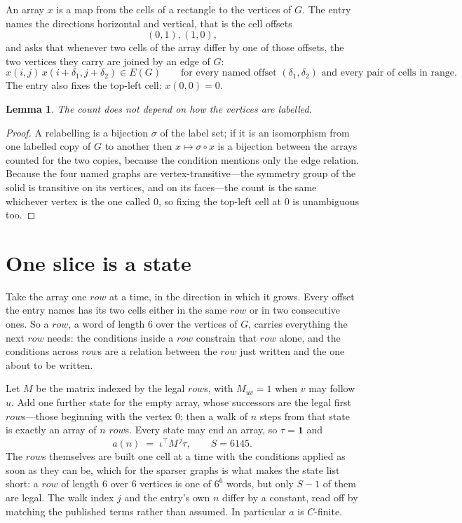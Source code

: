 \documentclass[11pt,a4paper]{article}
\theoremstyle{plain}
\newtheorem{lemma}[theorem]{Lemma}
\theoremstyle{definition}
\begin{document}
An array $x$ is a map from the cells of a rectangle to the vertices of $G$. The entry names the
directions horizontal and vertical, that is the cell offsets
\[
(0,1), (1,0),
\]
and asks that whenever two cells of the array differ by one of those offsets, the two vertices
they carry are joined by an edge of $G$:
\[
x(i,j)\,x(i+\delta_1,j+\delta_2)\in E(G)\qquad
\text{for every named offset } (\delta_1,\delta_2)\text{ and every pair of cells in range.}
\]
The entry also fixes the top-left cell: $x(0,0)=0$.

\begin{lemma}\label{lem:label}
The count does not depend on how the vertices are labelled.
\end{lemma}

\begin{proof}
A relabelling is a bijection $\sigma$ of the label set; if it is an isomorphism from one
labelled copy of $G$ to another then $x\mapsto\sigma\circ x$ is a bijection between the arrays
counted for the two copies, because the condition mentions only the edge relation.
Because the four named graphs are vertex-transitive---the symmetry group of the solid is transitive on its vertices, and on its faces---the count is the same whichever vertex is the one called $0$, so fixing the top-left cell at $0$ is unambiguous too.
\end{proof}

\section{One slice is a state}

Take the array one $row$ at a time, in the direction in which it grows.
Every offset the entry names has its two cells either in the same $row$ or in two
consecutive ones. So a $row$, a word of length $6$ over the vertices of $G$, carries
everything the next $row$ needs: the conditions inside a $row$ constrain that
$row$ alone, and the conditions across $row$s are a relation between the
$row$ just written and the one about to be written.

Let $M$ be the matrix indexed by the legal $row$s, with $M_{uv}=1$ when $v$ may
follow $u$. Add one further state for the empty array, whose successors are the legal first
$row$s---those beginning with the vertex $0$; then a walk of
$n$ steps from that state is exactly an array of $n$ $row$s. Every state may end an
array, so $\tau=\mathbf{1}$ and
\[
a(n)\;=\;\iota^{\!\top}M^{\,j}\tau ,\qquad S=6145.
\]
The $row$s themselves are built one cell at a time with the conditions applied as soon
as they can be, which for the sparser graphs is what makes the state list short: a $row$
of length $6$ over $6$ vertices is one of $6^{6}$ words, but only $S-1$ of them are
legal. The walk index $j$ and the entry's own $n$ differ by a constant, read off by matching the
published terms rather than assumed. In particular $a$ is $C$-finite.
\end{document}
